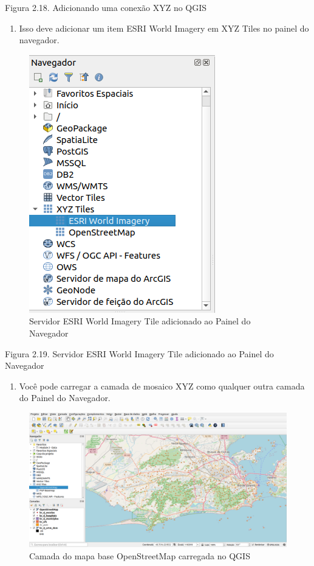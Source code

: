 \documentclass[
  portuguese,
]{krantz}
\providecommand{\tightlist}{%
  \setlength{\itemsep}{0pt}\setlength{\parskip}{0pt}}
\begin{document}
Figura 2.18. Adicionando uma conexão XYZ no QGIS

\begin{enumerate}
\def\labelenumi{\arabic{enumi}.}
\setcounter{enumi}{4}
\tightlist
\item
  Isso deve adicionar um item ESRI World Imagery em XYZ Tiles no painel do navegador.
\end{enumerate}

\begin{figure}
\centering
\includegraphics{media/modulo2/xyz-2.png}
\caption{Servidor ESRI World Imagery Tile adicionado ao Painel do Navegador}
\end{figure}

Figura 2.19. Servidor ESRI World Imagery Tile adicionado ao Painel do Navegador

\begin{enumerate}
\def\labelenumi{\arabic{enumi}.}
\setcounter{enumi}{5}
\tightlist
\item
  Você pode carregar a camada de mosaico XYZ como qualquer outra camada do Painel do Navegador.
\end{enumerate}

\begin{figure}
\centering
\includegraphics{media/modulo2/xyz-3.png}
\caption{Camada do mapa base OpenStreetMap carregada no QGIS}
\end{figure}
\end{document}

